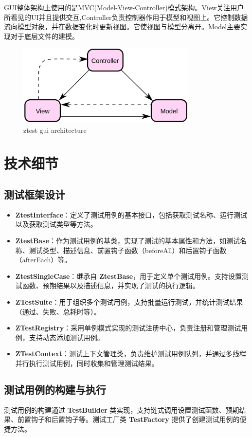 \documentclass[chinese]{article}
\begin{document}
GUI整体架构上使用的是MVC(Model-View-Controller)模式架构。View关注用户所看见的UI并且提供交互,Controller负责控制器作用于模型和视图上。它控制数据流向模型对象，并在数据变化时更新视图。它使视图与模型分离开。Model主要实现对于底层文件的建模。
\begin{figure}[H]
    \centering
    \includegraphics[width=0.8\textwidth]{img/mvc.png} %
    \caption{ ztest gui architecture}
    \label{fig:mvc}
\end{figure}
\section{技术细节}
\subsection{测试框架设计}

\begin{itemize}
    \item \textbf{ZtestInterface}：定义了测试用例的基本接口，包括获取测试名称、运行测试以及获取测试类型等方法。
    \item \textbf{ZtestBase}：作为测试用例的基类，实现了测试的基本属性和方法，如测试名称、测试类型、描述信息、前置钩子函数（beforeAll）和后置钩子函数（afterEach）等。
    \item \textbf{ZtestSingleCase}：继承自 \textbf{ZtestBase}，用于定义单个测试用例。支持设置测试函数、预期结果以及描述信息，并实现了测试的执行逻辑。
    \item \textbf{ZTestSuite}：用于组织多个测试用例，支持批量运行测试，并统计测试结果（通过、失败、总耗时等）。
    \item \textbf{ZTestRegistry}：采用单例模式实现的测试注册中心，负责注册和管理测试用例，支持动态添加测试用例。
    \item \textbf{ZTestContext}：测试上下文管理类，负责维护测试用例队列，并通过多线程并行执行测试用例，同时收集和管理测试结果。
\end{itemize}

\subsection{测试用例的构建与执行}
测试用例的构建通过 \textbf{TestBuilder} 类实现，支持链式调用设置测试函数、预期结果、前置钩子和后置钩子等。测试工厂类 \textbf{TestFactory} 提供了创建测试用例的便捷方法。
\end{document}
